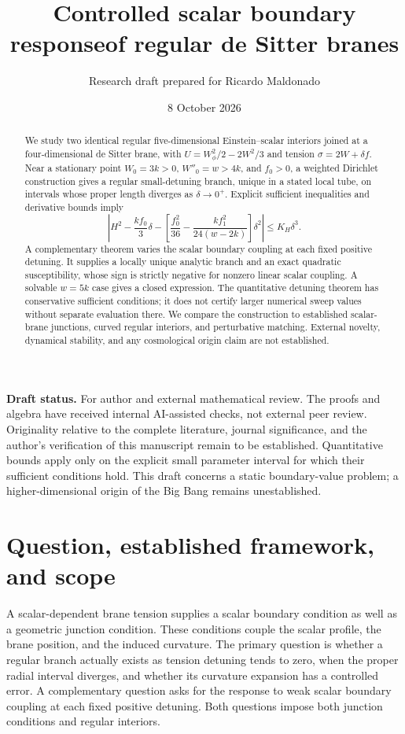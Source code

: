 \documentclass[11pt]{article}
\title{Controlled scalar boundary response\newline of regular de Sitter branes}
\author{Research draft prepared for Ricardo Maldonado}
\date{8 October 2026}
\begin{document}
\maketitle
\noindent\textbf{Draft status.} For author and external mathematical review. The proofs and algebra have received internal AI-assisted checks, not external peer review. Originality relative to the complete literature, journal significance, and the author's verification of this manuscript remain to be established. Quantitative bounds apply only on the explicit small parameter interval for which their sufficient conditions hold. This draft concerns a static boundary-value problem; a higher-dimensional origin of the Big Bang remains unestablished.

\begin{abstract}
We study two identical regular five-dimensional Einstein--scalar interiors joined at a four-dimensional de Sitter brane, with $U=W_\phi^2/2-2W^2/3$ and tension $\sigma=2W+\delta f$. Near a stationary point $W_0=3k>0$, $W''_0=w>4k$, and $f_0>0$, a weighted Dirichlet construction gives a regular small-detuning branch, unique in a stated local tube, on intervals whose proper length diverges as $\delta\to0^+$. Explicit sufficient inequalities and derivative bounds imply
\[
\left|H^2-\frac{kf_0}{3}\delta
-\left[\frac{f_0^2}{36}-\frac{kf_1^2}{24(w-2k)}\right]\delta^2\right|
\le K_H\delta^3.
\]
A complementary theorem varies the scalar boundary coupling at each fixed positive detuning. It supplies a locally unique analytic branch and an exact quadratic susceptibility, whose sign is strictly negative for nonzero linear scalar coupling. A solvable $w=5k$ case gives a closed expression. The quantitative detuning theorem has conservative sufficient conditions; it does not certify larger numerical sweep values without separate evaluation there. We compare the construction to established scalar-brane junctions, curved regular interiors, and perturbative matching. External novelty, dynamical stability, and any cosmological origin claim are not established.
\end{abstract}

\section{Question, established framework, and scope}
A scalar-dependent brane tension supplies a scalar boundary condition as well as a geometric junction condition. These conditions couple the scalar profile, the brane position, and the induced curvature. The primary question is whether a regular branch actually exists as tension detuning tends to zero, when the proper radial interval diverges, and whether its curvature expansion has a controlled error. A complementary question asks for the response to weak scalar boundary coupling at each fixed positive detuning. Both questions impose both junction conditions and regular interiors.
\end{document}
